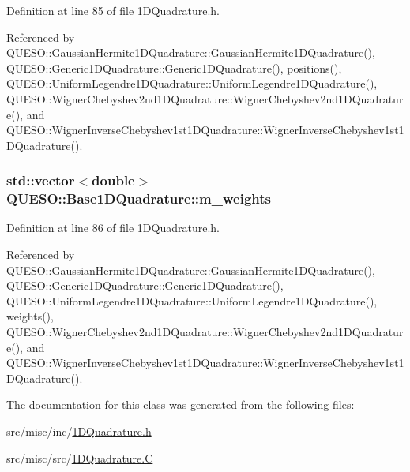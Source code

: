 Definition at line 85 of file 1\-D\-Quadrature.\-h.



Referenced by Q\-U\-E\-S\-O\-::\-Gaussian\-Hermite1\-D\-Quadrature\-::\-Gaussian\-Hermite1\-D\-Quadrature(), Q\-U\-E\-S\-O\-::\-Generic1\-D\-Quadrature\-::\-Generic1\-D\-Quadrature(), positions(), Q\-U\-E\-S\-O\-::\-Uniform\-Legendre1\-D\-Quadrature\-::\-Uniform\-Legendre1\-D\-Quadrature(), Q\-U\-E\-S\-O\-::\-Wigner\-Chebyshev2nd1\-D\-Quadrature\-::\-Wigner\-Chebyshev2nd1\-D\-Quadrature(), and Q\-U\-E\-S\-O\-::\-Wigner\-Inverse\-Chebyshev1st1\-D\-Quadrature\-::\-Wigner\-Inverse\-Chebyshev1st1\-D\-Quadrature().

\hypertarget{class_q_u_e_s_o_1_1_base1_d_quadrature_a7117fec020a8098d1c22b604268bad93}{
\subsubsection[{m\-\_\-weights}]{\setlength{\rightskip}{0pt plus 5cm}std\-::vector$<$double$>$ Q\-U\-E\-S\-O\-::\-Base1\-D\-Quadrature\-::m\-\_\-weights\hspace{0.3cm}{\ttfamily [protected]}}}\label{class_q_u_e_s_o_1_1_base1_d_quadrature_a7117fec020a8098d1c22b604268bad93}


Definition at line 86 of file 1\-D\-Quadrature.\-h.



Referenced by Q\-U\-E\-S\-O\-::\-Gaussian\-Hermite1\-D\-Quadrature\-::\-Gaussian\-Hermite1\-D\-Quadrature(), Q\-U\-E\-S\-O\-::\-Generic1\-D\-Quadrature\-::\-Generic1\-D\-Quadrature(), Q\-U\-E\-S\-O\-::\-Uniform\-Legendre1\-D\-Quadrature\-::\-Uniform\-Legendre1\-D\-Quadrature(), weights(), Q\-U\-E\-S\-O\-::\-Wigner\-Chebyshev2nd1\-D\-Quadrature\-::\-Wigner\-Chebyshev2nd1\-D\-Quadrature(), and Q\-U\-E\-S\-O\-::\-Wigner\-Inverse\-Chebyshev1st1\-D\-Quadrature\-::\-Wigner\-Inverse\-Chebyshev1st1\-D\-Quadrature().



The documentation for this class was generated from the following files\-:\begin{DoxyCompactItemize}
\item 
src/misc/inc/\hyperlink{1_d_quadrature_8h}{1\-D\-Quadrature.\-h}\item 
src/misc/src/\hyperlink{1_d_quadrature_8_c}{1\-D\-Quadrature.\-C}\end{DoxyCompactItemize}
